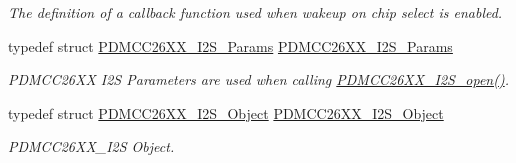 \begin{DoxyCompactItemize}
\begin{DoxyCompactList}\small\item\em The definition of a callback function used when wakeup on chip select is enabled. \end{DoxyCompactList}\item 
typedef struct \hyperlink{struct_p_d_m_c_c26_x_x___i2_s___params}{P\+D\+M\+C\+C26\+X\+X\+\_\+\+I2\+S\+\_\+\+Params} \hyperlink{_p_d_m_c_c26_x_x__util_8h_a7d296d85afcdecb82b5572261a03d3c2}{P\+D\+M\+C\+C26\+X\+X\+\_\+\+I2\+S\+\_\+\+Params}
\begin{DoxyCompactList}\small\item\em P\+D\+M\+C\+C26\+X\+X I2\+S Parameters are used when calling \hyperlink{_p_d_m_c_c26_x_x__util_8h_a8168bcdab9f1e46c26823555df6f797f}{P\+D\+M\+C\+C26\+X\+X\+\_\+\+I2\+S\+\_\+open()}. \end{DoxyCompactList}\item 
typedef struct \hyperlink{struct_p_d_m_c_c26_x_x___i2_s___object}{P\+D\+M\+C\+C26\+X\+X\+\_\+\+I2\+S\+\_\+\+Object} \hyperlink{_p_d_m_c_c26_x_x__util_8h_add23279adb905ee56c889bc38c2fe3d8}{P\+D\+M\+C\+C26\+X\+X\+\_\+\+I2\+S\+\_\+\+Object}
\begin{DoxyCompactList}\small\item\em P\+D\+M\+C\+C26\+X\+X\+\_\+\+I2\+S Object. \end{DoxyCompactList}\end{DoxyCompactItemize}
